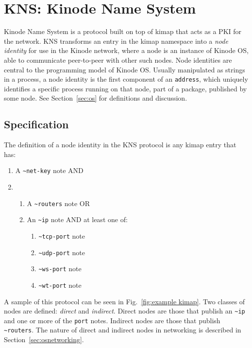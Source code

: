\documentclass[runningheads]{llncs}
\begin{document}
\section{KNS: Kinode Name System}
\label{sec:kns}

Kinode Name System is a protocol built on top of kimap that acts as a PKI for the network.
KNS transforms an entry in the kimap namespace into a \textit{node identity} for use in the Kinode network, where a node is an instance of Kinode OS, able to communicate peer-to-peer with other such nodes.
Node identities are central to the programming model of Kinode OS.
Usually manipulated as strings in a process, a node identity is the first component of an \verb|address|, which uniquely identifies a specific process running on that node, part of a package, published by some node. See Section~\ref{sec:os} for definitions and discussion.

\subsection{Specification}
\label{sec:knsspec}

The definition of a node identity in the KNS protocol is any kimap entry that has:

\begin{enumerate}
    \item A \verb|~net-key| note AND
    \item \begin{enumerate}
        \item A \verb|~routers| note OR
        \item An \verb|~ip| note AND at least one of:
            \begin{enumerate}
                \item \verb|~tcp-port| note
                \item \verb|~udp-port| note
                \item \verb|~ws-port| note
                \item \verb|~wt-port| note
            \end{enumerate}
        \end{enumerate}
\end{enumerate}

A sample of this protocol can be seen in Fig.~\ref{fig:example kimap}.
Two classes of nodes are defined: \textit{direct} and \textit{indirect}.
Direct nodes are those that publish an \verb|~ip| and one or more of the \verb|port| notes.
Indirect nodes are those that publish \verb|~routers|.
The nature of direct and indirect nodes in networking is described in Section~\ref{sec:osnetworking}.
\end{document}

